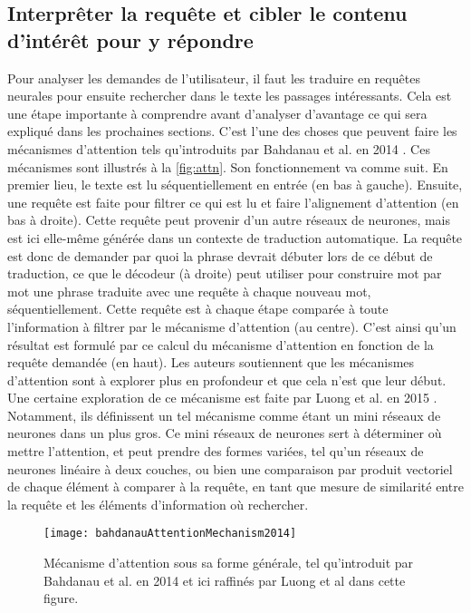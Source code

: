 \subsection{Interprêter la requête et cibler le contenu d'intérêt pour y répondre}

Pour analyser les demandes de l'utilisateur, il faut les traduire en requêtes neurales pour ensuite rechercher dans le texte les passages intéressants. Cela est une étape importante à comprendre avant d'analyser d'avantage ce qui sera expliqué dans les prochaines sections. C'est l'une des choses que peuvent faire les mécanismes d'attention tels qu'introduits par Bahdanau et al. en 2014 \cite{attentionMechanism}. Ces mécanismes sont illustrés à la \autoref{fig:attn}. Son fonctionnement va comme suit. En premier lieu, le texte est lu séquentiellement en entrée (en bas à gauche). Ensuite, une requête est faite pour filtrer ce qui est lu et faire l'alignement d'attention (en bas à droite). Cette requête peut provenir d'un autre réseaux de neurones, mais est ici elle-même générée dans un contexte de traduction automatique. La requête est donc de demander par quoi la phrase devrait débuter lors de ce début de traduction, ce que le décodeur (à droite) peut utiliser pour construire mot par mot une phrase traduite avec une requête à chaque nouveau mot, séquentiellement. Cette requête est à chaque étape comparée à toute l'information à filtrer par le mécanisme d'attention (au centre). C'est ainsi qu'un résultat est formulé par ce calcul du mécanisme d'attention en fonction de la requête demandée (en haut). Les auteurs soutiennent que les mécanismes d'attention sont à explorer plus en profondeur et que cela n'est que leur début. Une certaine exploration de ce mécanisme est faite par Luong et al. en 2015 \cite{attentionBasedApproaches}. Notamment, ils définissent un tel mécanisme comme étant un mini réseaux de neurones dans un plus gros. Ce mini réseaux de neurones sert à déterminer où mettre l'attention, et peut prendre des formes variées, tel qu'un réseaux de neurones linéaire à deux couches, ou bien une comparaison par produit vectoriel de chaque élément à comparer à la requête, en tant que mesure de similarité entre la requête et les éléments d'information où rechercher. \\

\begin{figure*}
  \centering
  \texttt{[image: bahdanauAttentionMechanism2014]}
  \caption{Mécanisme d'attention sous sa forme générale, tel qu'introduit par Bahdanau et al. en 2014 \cite{attentionMechanism} et ici raffinés par Luong et al \cite{attentionBasedApproaches} dans cette figure.}
  \label{fig:attn}
\end{figure*}

